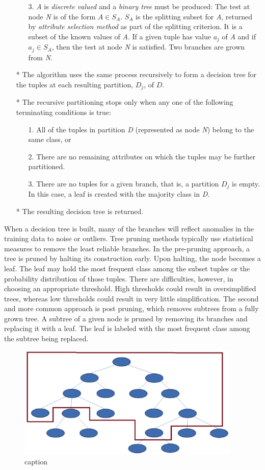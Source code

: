 \begin{itemize}
\begin{itemize}
\item[3.] \textit{A} is \textit{discrete valued} and a \textit{binary tree} must be produced:  The test at node \textit{N} is of the form $A \in S_{A}$.  $S_{A}$ is the splitting subset for \textit{A}, returned by \textit{attribute selection method} as part of the splitting criterion. It is a subset of the known values of \textit{A}.  If a given tuple has value $a_{j}$ of \textit{A} and if $a_{j} \in S_{A}$, then the test at node \textit{N} is satisfied.  Two branches are grown from \textit{N}.
\end{itemize}
\item[*] The algorithm uses the same process recursively to form a decision tree for the tuples at each resulting partition, $D_{j}$, of $D$.
\item[*] The recursive partitioning stops only when any one of the following terminating conditions is true:
\begin{itemize}
\item[1.] All of the tuples in partition \textit{D} (represented as node \textit{N}) belong to the same class, or
\item[2.] There are no remaining attributes on which the tuples may be further partitioned.
\item[3.] There are no tuples for a given branch, that is, a partition $D_{j}$ is empty.  In this case, a leaf is created with the majority class in \textit{D.}
\end{itemize}
\item[*] The resulting decision tree is returned.
\end{itemize}
When a decision tree is built, many of the branches will reflect anomalies in the training data  to noise or outliers.
Tree pruning methods typically use statistical measures to remove the least reliable branches.
In the pre-pruning approach, a tree is pruned by halting its construction early.
Upon halting, the node becomes a leaf. The leaf may hold the most frequent class among the subset tuples or the probability distribution of those tuples.
There are difficulties, however, in choosing an appropriate threshold.
High thresholds could result in oversimplified trees, whereas low thresholds could result in very little simplification.
The second and more common approach is post pruning, which removes subtrees from a fully grown tree.  A subtree of a given node is pruned by removing its branches and replacing it with a leaf.  The leaf is labeled with the most frequent class among the subtree being replaced.

\begin{figure}[htbp]
  \centering
  \includegraphics[width=0.95\textwidth]{arbolpoda}
  \caption{caption}
  \label{fig:label}
\end{figure}

\clearemptydoublepage
